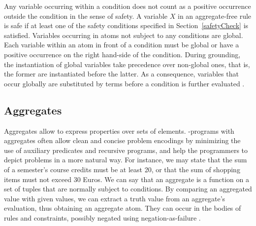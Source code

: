 \documentclass[a4paper, titlepage]{article}
\begin{document}
Any variable occurring 
within a condition does not count as a positive occurrence 
outside the condition in the sense of safety. A variable 
$X$ in an aggregate-free rule is safe if at least one of 
the safety conditions specified in Section~\ref{safetyCheck} is satisfied.
Variables occurring in atoms not subject to any conditions 
are global. Each variable within an atom in front of a 
condition must be global or have a positive occurrence on 
the right hand-side of the condition. During grounding, the 
instantiation of global variables take precedence over non-global ones, that is, the former are instantiated before 
the latter. As a consequence, variables that occur globally 
are substituted by terms before a condition is further 
evaluated \cite{gkklorst2015}.    

\subsection{Aggregates}
\label{aggregates}
Aggregates allow to express properties over sets of 
elements. \hex{}-programs with aggregates often allow clean 
and concise problem encodings by minimizing the use of 
auxiliary predicates and recursive programs, and help the 
programmers to depict problems in a more natural way. For 
instance, we may state that the sum of a semester's course 
credits must be at least 20, or that the sum of shopping 
items must not exceed 30 Euros. We can say that an 
aggregate is a function on a set of tuples that are 
normally subject to conditions. By comparing an aggregated 
value with given values, we can extract a truth value from 
an aggregate's evaluation, thus obtaining an aggregate 
atom. They can occur in the bodies of rules and constraints, 
possibly negated using negation-as-failure \cite{gkklorst2015}.
\end{document}
